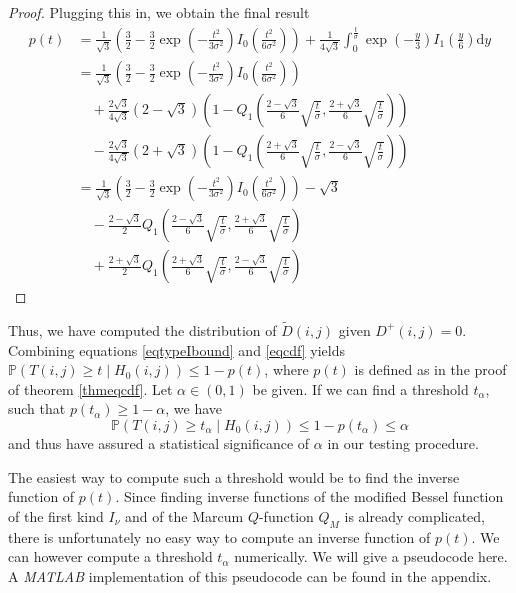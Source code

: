 \documentclass[a4paper,12pt]{article}
\theoremstyle{plain}
\theoremstyle{definition}
\theoremstyle{remark}
\begin{document}
\begin{proof}
	Plugging this in, we obtain the final result
	\begin{align*}
		p(t) &= \frac{1}{\sqrt{3}} \left( \frac{3}{2} - \frac{3}{2} \exp \left( - \frac{t^2}{3 \sigma^2} \right) I_0 \left( \frac{t^2}{6 \sigma^2} \right) \right) + \frac{1}{4 \sqrt{3}} \int_0^\frac{t}{\sigma} \exp \left( - \frac{y}{3} \right) I_1 \left( \frac{y}{6} \right) \mathrm{d}y \\
		&= \frac{1}{\sqrt{3}} \left( \frac{3}{2} - \frac{3}{2} \exp \left( - \frac{t^2}{3 \sigma^2} \right) I_0 \left( \frac{t^2}{6 \sigma^2} \right) \right) \\
		&\quad + \frac{2 \sqrt{3}}{4 \sqrt{3}} (2 - \sqrt{3}) \left( 1 - Q_1 \left( \frac{2 - \sqrt{3}}{6} \sqrt{\frac{t}{\sigma}}, \frac{2 + \sqrt{3}}{6} \sqrt{\frac{t}{\sigma}} \right) \right) \\
		&\quad - \frac{2 \sqrt{3}}{4 \sqrt{3}} (2 + \sqrt{3}) \left( 1 - Q_1 \left( \frac{2 + \sqrt{3}}{6} \sqrt{\frac{t}{\sigma}}, \frac{2 - \sqrt{3}}{6} \sqrt{\frac{t}{\sigma}} \right) \right) \\
		&= \frac{1}{\sqrt{3}} \left( \frac{3}{2} - \frac{3}{2} \exp \left( - \frac{t^2}{3 \sigma^2} \right) I_0 \left( \frac{t^2}{6 \sigma^2} \right) \right) - \sqrt{3} \\
		&\quad - \frac{2 - \sqrt{3}}{2} Q_1 \left( \frac{2 - \sqrt{3}}{6} \sqrt{\frac{t}{\sigma}}, \frac{2 + \sqrt{3}}{6} \sqrt{\frac{t}{\sigma}} \right) \\
		&\quad + \frac{2 + \sqrt{3}}{2} Q_1 \left( \frac{2 + \sqrt{3}}{6} \sqrt{\frac{t}{\sigma}}, \frac{2 - \sqrt{3}}{6} \sqrt{\frac{t}{\sigma}} \right)
	\end{align*}
\end{proof}

Thus, we have computed the distribution of $\tilde{D}(i, j)$ given $D^+(i, j) = 0$. Combining equations \eqref{eqtypeIbound} and \eqref{eqcdf} yields $\mathbb{P}(T(i, j) \geq t \mid H_0(i, j)) \leq 1 - p(t)$, where $p(t)$ is defined as in the proof of theorem \ref{thmeqcdf}. Let $\alpha \in (0, 1)$ be given. If we can find a threshold $t_\alpha$, such that $p(t_\alpha) \geq 1 - \alpha$, we have
\begin{equation}
	\mathbb{P}(T(i, j) \geq t_\alpha \mid H_0(i, j)) \leq 1 - p(t_\alpha) \leq \alpha
\end{equation}
and thus have assured a statistical significance of $\alpha$ in our testing procedure.

The easiest way to compute such a threshold would be to find the inverse function of $p(t)$. Since finding inverse functions of the modified Bessel function of the first kind $I_\nu$ and of the Marcum $Q$-function $Q_M$ is already complicated, there is unfortunately no easy way to compute an inverse function of $p(t)$. We can however compute a threshold $t_\alpha$ numerically. We will give a pseudocode here. A \emph{MATLAB} implementation of this pseudocode can be found in the appendix.\\
\end{document}
